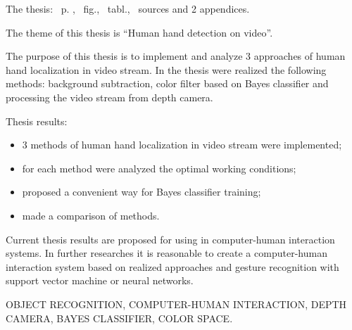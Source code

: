 
The thesis: \pageref*{MyLastPage}~p. , \totfig~fig., \tottab~tabl., ~sources and 2 appendices.

The theme of this thesis is ``Human hand detection on video''.

The purpose of this thesis is to implement and analyze 3 approaches of human hand localization in video stream. In the thesis were realized the following methods: background subtraction, color filter based on Bayes classifier and processing the video stream from depth camera.

Thesis results:
\begin{itemize}
	\item 3 methods of human hand localization in video stream were implemented;
	\item for each method were analyzed the optimal working conditions;
	\item proposed a convenient way for Bayes classifier training;
	\item made a comparison of methods.
\end{itemize}

Current thesis results are proposed for using in computer-human interaction systems. In further researches it is reasonable to create a computer-human interaction system based on realized approaches and gesture recognition with support vector machine or neural networks.

\MakeUppercase{Object recognition, computer-human interaction, depth camera, Bayes classifier, color space.} 